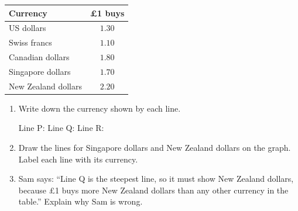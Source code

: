 \documentclass[12pt,a4paper]{article}
\newcommand{\ansline}[1][2.2cm]{\underline{\hspace{#1}}}
\newcommand{\linename}[1]{node[pos=1,right,font=\small\bfseries,text=black]{#1}}
\begin{document}
\begin{enumerate}
\begin{minipage}[t]{0.52\linewidth}
\centering
{}
\end{minipage}%
\begin{minipage}[t]{0.48\linewidth}
\vspace{6pt}
\begin{tabular}{|l|c|}
\hline
\textbf{Currency} & \textbf{\pounds1 buys}\\
\hline
US dollars & $1.30$\\
\hline
Swiss francs & $1.10$\\
\hline
Canadian dollars & $1.80$\\
\hline
Singapore dollars & $1.70$\\
\hline
New Zealand dollars & $2.20$\\
\hline
\end{tabular}
\end{minipage}

\begin{enumerate}
  \item Write down the currency shown by each line.

        Line P: \ansline[3.5cm] \quad Line Q: \ansline[3.5cm] \quad
        Line R: \ansline[3.5cm]

        \vspace{5em}
  \item Draw the lines for Singapore dollars and New Zealand dollars on the
        graph. Label each line with its currency.
  \item Sam says: ``Line Q is the steepest line, so it must show New Zealand
        dollars, because \pounds1 buys more New Zealand dollars than any other
        currency in the table.'' Explain why Sam is wrong.

        \vspace{7em}
\end{enumerate}

\end{enumerate}
\end{document}
